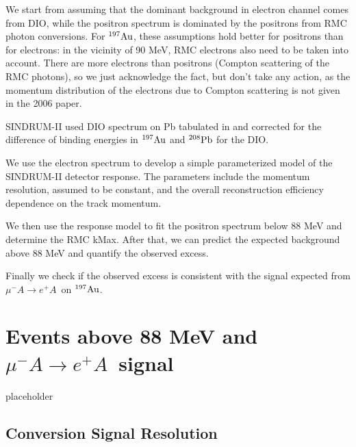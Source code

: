 \documentclass[12pt]{article}
\newcommand {\Au}[1]     {\mbox{$\rm ^{#1}Au$}}                 %
\newcommand {\mumepconv} {\mbox{$\mu^- A \rightarrow e^+ A$}}
\newcommand {\Pb}[1]     {\mbox{$\rm ^{#1}Pb$}}                 %
\begin{document}
We start from assuming that the dominant background in electron channel comes from DIO,
while the positron spectrum is dominated by the positrons from RMC photon conversions.
For \Au{197}, these assumptions hold better for positrons than for electrons:
in the vicinity of 90 MeV, RMC electrons also need to be taken into account.
There are more electrons than positrons (Compton scattering of the RMC photons),
so we just acknowledge the fact, but don't take any action, as the momentum distribution
of the electrons due to Compton scattering is not given in the 2006 paper.

SINDRUM-II used DIO spectrum on Pb tabulated in \cite{Watanabe_1993} and corrected for the
difference of binding energies in \Au{197} and \Pb{208} for the DIO.

We use the electron spectrum to develop a simple parameterized model of
the SINDRUM-II detector response. The parameters include the momentum resolution,
assumed to be constant, and the overall reconstruction efficiency dependence on the 
track momentum.

We then use the response model to fit the positron spectrum below 88 MeV and
determine the RMC kMax. After that, we can predict the expected background
above 88 MeV and quantify the observed excess.

Finally we check if the observed excess is consistent with the signal expected from
\mumepconv\ on \Au{197}.




\newpage
\section {Events above 88 MeV and \mumepconv\ signal}

placeholder


\subsection {Conversion Signal Resolution}
\end{document}

